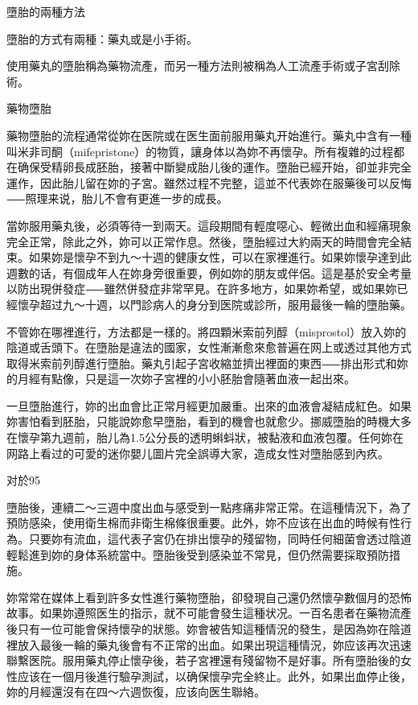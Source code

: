 \documentclass[12pt,UTF8]{ctexbook}
\begin{document}
墮胎的兩種方法

墮胎的方式有兩種：藥丸或是小手術。

使用藥丸的墮胎稱為藥物流產，而另一種方法則被稱為人工流產手術或子宮刮除術。





藥物墮胎

藥物墮胎的流程通常從妳在医院或在医生面前服用藥丸开始進行。藥丸中含有一種叫米非司酮（mifepristone）的物質，讓身体以為妳不再懷孕。所有複雜的过程都在确保受精卵長成胚胎，接著中斷變成胎儿後的運作。墮胎已經开始，卻並非完全運作，因此胎儿留在妳的子宮。雖然过程不完整，這並不代表妳在服藥後可以反悔⸺照理来说，胎儿不會有更進一步的成長。

當妳服用藥丸後，必須等待一到兩天。這段期間有輕度噁心、輕微出血和經痛現象完全正常，除此之外，妳可以正常作息。然後，墮胎經过大約兩天的時間會完全結束。如果妳是懷孕不到九〜十週的健康女性，可以在家裡進行。如果妳懷孕達到此週數的话，有個成年人在妳身旁很重要，例如妳的朋友或伴侶。這是基於安全考量以防出現併發症⸺雖然併發症非常罕見。在許多地方，如果妳希望，或如果妳已經懷孕超过九〜十週，以門診病人的身分到医院或診所，服用最後一輪的墮胎藥。

不管妳在哪裡進行，方法都是一樣的。將四顆米索前列醇（misprostol）放入妳的陰道或舌頭下。在墮胎是違法的國家，女性漸漸愈來愈普遍在网上或透过其他方式取得米索前列醇進行墮胎。藥丸引起子宮收縮並擠出裡面的東西⸺排出形式和妳的月經有點像，只是這一次妳子宮裡的小小胚胎會隨著血液一起出來。

一旦墮胎進行，妳的出血會比正常月經更加嚴重。出來的血液會凝結成紅色。如果妳害怕看到胚胎，只能說妳愈早墮胎，看到的機會也就愈少。挪威墮胎的時機大多在懷孕第九週前，胎儿為1.5公分長的透明蝌蚪狀，被黏液和血液包覆。任何妳在网路上看过的可愛的迷你嬰儿圖片完全誤導大家，造成女性对墮胎感到內疚。

对於95%

墮胎後，連續二〜三週中度出血与感受到一點疼痛非常正常。在這種情況下，為了預防感染，使用衛生棉而非衛生棉條很重要。此外，妳不应该在出血的時候有性行為。只要妳有流血，這代表子宮仍在排出懷孕的殘留物，同時任何細菌會透过陰道輕鬆進到妳的身体系統當中。墮胎後受到感染並不常見，但仍然需要採取預防措施。

妳常常在媒体上看到許多女性進行藥物墮胎，卻發現自己還仍然懷孕數個月的恐怖故事。如果妳遵照医生的指示，就不可能會發生這種状况。一百名患者在藥物流產後只有一位可能會保持懷孕的狀態。妳會被告知這種情況的發生，是因為妳在陰道裡放入最後一輪的藥丸後會有不正常的出血。如果出現這種情況，妳应该再次迅速聯繫医院。服用藥丸停止懷孕後，若子宮裡還有殘留物不是好事。所有墮胎後的女性应该在一個月後進行驗孕測試，以确保懷孕完全終止。此外，如果出血停止後，妳的月經還沒有在四〜六週恢復，应该向医生聯絡。
\end{document}
